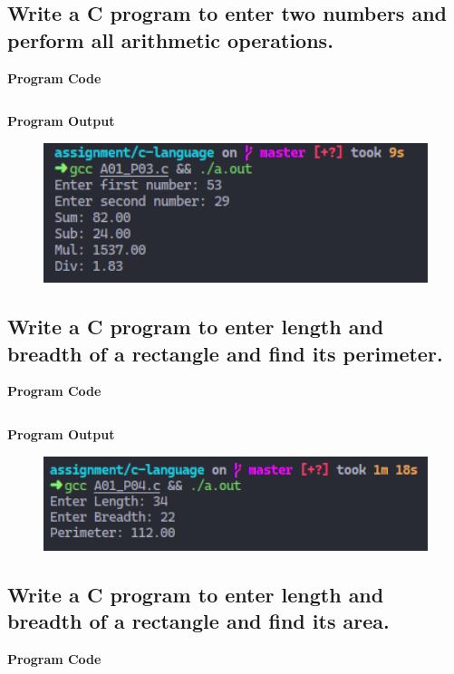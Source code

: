 \documentclass[a4paper, onecolumn]{article}
\begin{document}


\subsection{Write a C program to enter two numbers and perform all arithmetic operations.}
\textbf{Program Code}

\inputminted{C}{programs/A01_P03.c}

\textbf{Program Output}

\begin{figure}[h]
  \includegraphics[width=12cm]{A01_P03}
\end{figure}

\newpage



\subsection{Write a C program to enter length and breadth of a rectangle and find its perimeter.}
\textbf{Program Code}

\inputminted{C}{programs/A01_P04.c}

\textbf{Program Output}

\begin{figure}[h]
  \includegraphics[width=12cm]{A01_P04}
\end{figure}

\newpage



\subsection{Write a C program to enter length and breadth of a rectangle and find its area.}
\textbf{Program Code}
\end{document}
